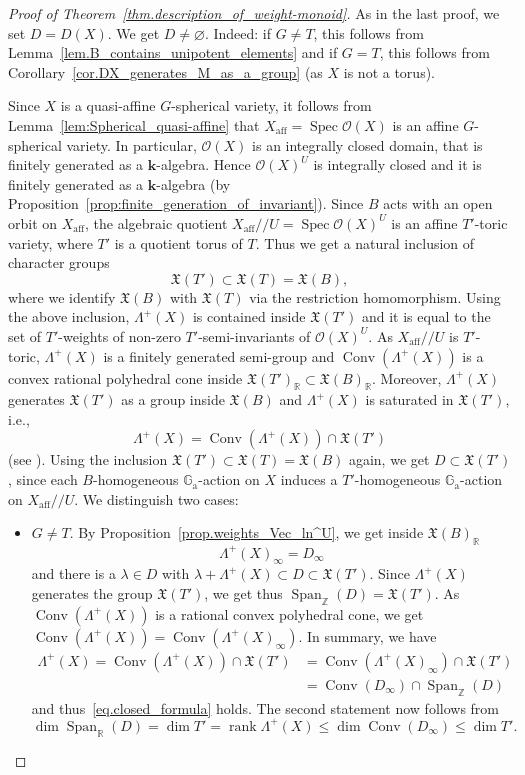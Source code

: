 \documentclass[11pt]{article}
\newcommand{\ie}{i.e.,\xspace}
\numberwithin{equation}{section}
\let\mathcal\mathscr
\newcommand{\ra}{\mathrm{a}}
\theoremstyle{plain}
\theoremstyle{definition}
\DeclareMathOperator{\Spec}{Spec}
\DeclareMathOperator{\rank}{rank}
\DeclareMathOperator{\aff}{aff}
\DeclareMathOperator{\Conv}{Conv}
\DeclareMathOperator{\Span}{Span}
\newcommand{\OO}{\mathcal{O}}
\newcommand{\GG}{\mathbb{G}}
\newcommand{\RR}{\mathbb{R}}
\newcommand{\ZZ}{\mathbb{Z}}
\newcommand{\kk}{{\boldsymbol{k}}}
\newcommand{\aquot}{/ \! \! /}
\begin{document}
\begin{proof}[Proof of Theorem~\ref{thm.description_of_weight-monoid}]
As in the last proof, we set $D = D(X)$. We get $D \neq \varnothing$. Indeed: if $G \neq T$, this follows
from Lemma~\ref{lem.B_contains_unipotent_elements} and if $G = T$, this follows from Corollary~\ref{cor.DX_generates_M_as_a_group} (as $X$ is not a torus).

Since $X$ is a quasi-affine $G$-spherical variety, it follows from Lemma~\ref{lem:Spherical_quasi-affine}
that $X_{\aff} = \Spec \OO(X)$ is an affine $G$-spherical variety.
In particular, $\OO(X)$ is an integrally closed domain, that is finitely generated as a $\kk$-algebra.
Hence $\OO(X)^U$ is integrally closed and
it is finitely generated as a $\kk$-algebra (by Proposition~\ref{prop:finite_generation_of_invariant}).
Since $B$ acts with an open orbit on $X_{\aff}$, the algebraic quotient
$X_{\aff} \aquot U = \Spec \OO(X)^U$ is an affine $T'$-toric variety, where $T'$ is a quotient torus
of $T$. Thus we get a natural inclusion of character groups
\[
\mathfrak{X}(T') \subset \mathfrak{X}(T) = \mathfrak{X}(B),
\]
where we identify $\mathfrak{X}(B)$ with $\mathfrak{X}(T)$ via the restriction homomorphism.
Using the above inclusion, $\Lambda^+(X)$ is contained
inside $\mathfrak{X}(T')$ and it is equal to the set of $T'$-weights of non-zero $T'$-semi-invariants
of $\OO(X)^U$. As $X_{\aff} \aquot U$ is $T'$-toric, $\Lambda^+(X)$ is a finitely generated semi-group and $\Conv(\Lambda^+(X))$
is a convex rational polyhedral cone inside $\mathfrak{X}(T')_{\RR} \subset \mathfrak{X}(B)_{\RR}$.
Moreover, $\Lambda^+(X)$ generates $\mathfrak{X}(T')$ as a group inside $\mathfrak{X}(B)$ and
$\Lambda^+(X)$ is saturated in $\mathfrak{X}(T')$, \ie
\[
\Lambda^+(X) = \Conv(\Lambda^+(X)) \cap \mathfrak{X}(T')
\]
(see \cite[Ex.\,1.3.4\,(a)]{CoLiSc2011Toric-varieties}). Using the inclusion
$\mathfrak{X}(T') \subset \mathfrak{X}(T) = \mathfrak{X}(B)$ again, we get $D \subset \mathfrak{X}(T')$, since each
$B$-homogeneous $\GG_\ra$-action on $X$ induces a $T'$-homogeneous $\GG_\ra$-action on
$X_{\aff} \aquot U$. We distinguish two cases:

\begin{itemize}
\item $G \neq T$. By Proposition~\ref{prop.weights_Vec_ln^U}, we get inside $\mathfrak{X}(B)_{\RR}$
\[
\Lambda^+(X)_{\infty} = D_{\infty}
\]
and there is a $\lambda \in D$ with $\lambda + \Lambda^+(X) \subset D \subset \mathfrak{X}(T')$.
Since $\Lambda^+(X)$ generates the group $\mathfrak{X}(T')$, we get thus $\Span_{\ZZ}(D) = \mathfrak{X}(T')$.
As $\Conv(\Lambda^+(X))$ is a rational convex polyhedral cone, we get
$\Conv(\Lambda^+(X)) = \Conv(\Lambda^+(X)_{\infty})$.
In summary, we have
\begin{align*}
\Lambda^+(X) = \Conv(\Lambda^+(X)) \cap \mathfrak{X}(T')
&= \Conv(\Lambda^+(X)_\infty) \cap \mathfrak{X}(T') \\
&= \Conv ( D_{\infty}) \cap \Span_{\ZZ}(D)
\end{align*}
and thus~\eqref{eq.closed_formula} holds. The second statement now follows from
\[
\dim \Span_{\RR}(D) = \dim T' = \rank \Lambda^+(X) \leq
\dim \Conv(D_\infty) \leq \dim T'.
\]


\end{itemize}
\end{proof}
\end{document}
